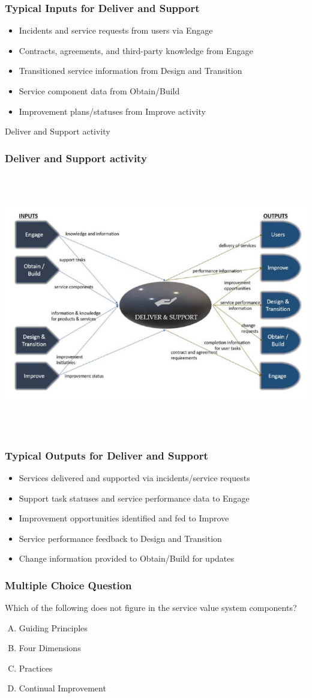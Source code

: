 \documentclass[aspectratio=169, table]{beamer}
\begin{document}
\begin{frame}
	\frametitle{Typical Inputs for Deliver and Support}
	\begin{itemize}
		\item Incidents and service requests from users via Engage
		\item Contracts, agreements, and third-party knowledge from Engage
		\item Transitioned service information from Design and Transition
		\item Service component data from Obtain/Build
		\item Improvement plans/statuses from Improve activity
	\end{itemize}
\end{frame}

\begin{frame}{Deliver and Support activity} 	 \frametitle{ Deliver and Support activity } \begin{center} 	\includegraphics[width=0.6\linewidth]{images/image-08.png} \end{center} \end{frame}

\begin{frame}
	\frametitle{Typical Outputs for Deliver and Support}
	\begin{itemize}
		\item Services delivered and supported via incidents/service requests
		\item Support task statuses and service performance data to Engage
		\item Improvement opportunities identified and fed to Improve
		\item Service performance feedback to Design and Transition
		\item Change information provided to Obtain/Build for updates
	\end{itemize}
\end{frame}

\begin{frame}
	\frametitle{Multiple Choice Question}
	Which of the following does not figure in the service value system components?
	\begin{enumerate}[A.]
		\item Guiding Principles
		\item Four Dimensions
		\item Practices
		\item Continual Improvement
	\end{enumerate}
\end{frame}
\end{document}
